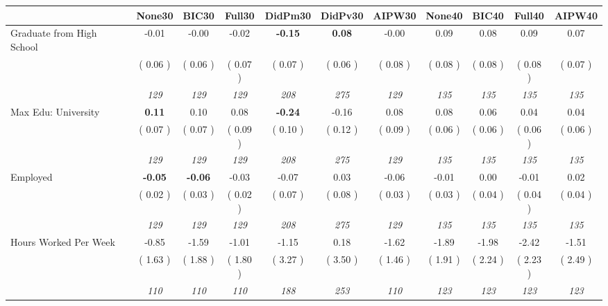 \begin{tabular}{l c c c c c c c c c c}
\toprule
 & None30 & BIC30 & Full30 & DidPm30 & DidPv30 & AIPW30 & None40 & BIC40 & Full40 & AIPW40 \\
\midrule
Graduate from High School &     -0.01 &     -0.00 &     -0.02 & \textbf{     -0.15 } & \textbf{      0.08 } &     -0.00 &      0.09 &      0.08 &      0.09 &      0.07 \\
& (     0.06 ) & (     0.06 ) & (     0.07 ) & (     0.07 ) & (     0.06 ) & (     0.08 ) & (     0.08 ) & (     0.08 ) & (     0.08 ) & (     0.07 ) \\
& \textit{ 129 } & \textit{ 129 } & \textit{ 129 } & \textit{ 208 } & \textit{ 275 } & \textit{ 129 } & \textit{ 135 } & \textit{ 135 } & \textit{ 135 } & \textit{ 135 } \\
Max Edu: University & \textbf{      0.11 } &      0.10 &      0.08 & \textbf{     -0.24 } &     -0.16 &      0.08 &      0.08 &      0.06 &      0.04 &      0.04 \\
& (     0.07 ) & (     0.07 ) & (     0.09 ) & (     0.10 ) & (     0.12 ) & (     0.09 ) & (     0.06 ) & (     0.06 ) & (     0.06 ) & (     0.06 ) \\
& \textit{ 129 } & \textit{ 129 } & \textit{ 129 } & \textit{ 208 } & \textit{ 275 } & \textit{ 129 } & \textit{ 135 } & \textit{ 135 } & \textit{ 135 } & \textit{ 135 } \\
Employed & \textbf{     -0.05 } & \textbf{     -0.06 } &     -0.03 &     -0.07 &      0.03 &     -0.06 &     -0.01 &      0.00 &     -0.01 &      0.02 \\
& (     0.02 ) & (     0.03 ) & (     0.02 ) & (     0.07 ) & (     0.08 ) & (     0.03 ) & (     0.03 ) & (     0.04 ) & (     0.04 ) & (     0.04 ) \\
& \textit{ 129 } & \textit{ 129 } & \textit{ 129 } & \textit{ 208 } & \textit{ 275 } & \textit{ 129 } & \textit{ 135 } & \textit{ 135 } & \textit{ 135 } & \textit{ 135 } \\
Hours Worked Per Week &     -0.85 &     -1.59 &     -1.01 &     -1.15 &      0.18 &     -1.62 &     -1.89 &     -1.98 &     -2.42 &     -1.51 \\
& (     1.63 ) & (     1.88 ) & (     1.80 ) & (     3.27 ) & (     3.50 ) & (     1.46 ) & (     1.91 ) & (     2.24 ) & (     2.23 ) & (     2.49 ) \\
& \textit{ 110 } & \textit{ 110 } & \textit{ 110 } & \textit{ 188 } & \textit{ 253 } & \textit{ 110 } & \textit{ 123 } & \textit{ 123 } & \textit{ 123 } & \textit{ 123 } \\

\end{tabular}
